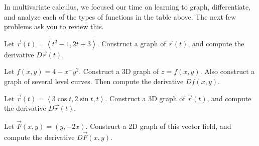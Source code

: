 In multivariate calculus, we focused our time on learning to graph, differentiate, and analyze each of the types of functions in the table above. The next few problems ask you to review this.

\begin{problem}
Let $\vec r(t) = \left<t^2-1, 2t+3\right>$.  
Construct a graph of $\vec r(t)$, and 
compute the derivative $D\vec r(t)$. 
\end{problem}

\begin{problem}
Let $f(x,y) = 4-x^-y^2$.  
Construct a 3D graph of $z=f(x,y)$.  
Also construct a graph of several level curves.
Then compute the derivative $Df(x,y)$. 
\end{problem}

\begin{problem}
Let $\vec r(t) = \left<3\cos t, 2\sin t, t\right>$.  
Construct a 3D graph of $\vec r(t)$, and 
compute the derivative $D\vec r(t)$. 
\end{problem}

\begin{problem}
Let $\vec F(x,y) = (y,-2x)$.  
Construct a 2D graph of this vector field, and 
compute the derivative $D\vec F(x,y)$. 
\end{problem}





